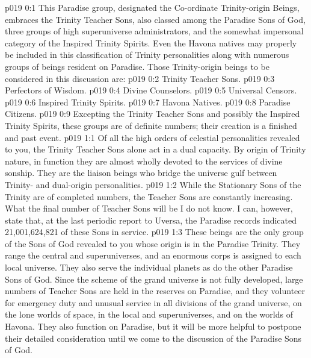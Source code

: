 \author{Divine Counselor}
\vs p019 0:1 This Paradise group, designated the Co\hyp{}ordinate Trinity\hyp{}origin Beings, embraces the Trinity Teacher Sons, also classed among the Paradise Sons of God, three groups of high superuniverse administrators, and the somewhat impersonal category of the Inspired Trinity Spirits. Even the Havona natives may properly be included in this classification of Trinity personalities along with numerous groups of beings resident on Paradise. Those Trinity\hyp{}origin beings to be considered in this discussion are:
\pc \vs p019 0:2 \bibnobreakspace Trinity Teacher Sons.
\vs p019 0:3 \bibnobreakspace Perfectors of Wisdom.
\vs p019 0:4 \bibnobreakspace Divine Counselors.
\vs p019 0:5 \bibnobreakspace Universal Censors.
\vs p019 0:6 \bibnobreakspace Inspired Trinity Spirits.
\vs p019 0:7 \bibnobreakspace Havona Natives.
\vs p019 0:8 \bibnobreakspace Paradise Citizens.
\pc \vs p019 0:9 Excepting the Trinity Teacher Sons and possibly the Inspired Trinity Spirits, these groups are of definite numbers; their creation is a finished and past event.
\vs p019 1:1 Of all the high orders of celestial personalities revealed to you, the Trinity Teacher Sons alone act in a dual capacity. By origin of Trinity nature, in function they are almost wholly devoted to the services of divine sonship. They are the liaison beings who bridge the universe gulf between Trinity\hyp{} and dual\hyp{}origin personalities.
\vs p019 1:2 While the Stationary Sons of the Trinity are of completed numbers, the Teacher Sons are constantly increasing. What the final number of Teacher Sons will be I do not know. I can, however, state that, at the last periodic report to Uversa, the Paradise records indicated 21,001,624,821 of these Sons in service.
\vs p019 1:3 These beings are the only group of the Sons of God revealed to you whose origin is in the Paradise Trinity. They range the central and superuniverses, and an enormous corps is assigned to each local universe. They also serve the individual planets as do the other Paradise Sons of God. Since the scheme of the grand universe is not fully developed, large numbers of Teacher Sons are held in the reserves on Paradise, and they volunteer for emergency duty and unusual service in all divisions of the grand universe, on the lone worlds of space, in the local and superuniverses, and on the worlds of Havona. They also function on Paradise, but it will be more helpful to postpone their detailed consideration until we come to the discussion of the Paradise Sons of God.\plusone
